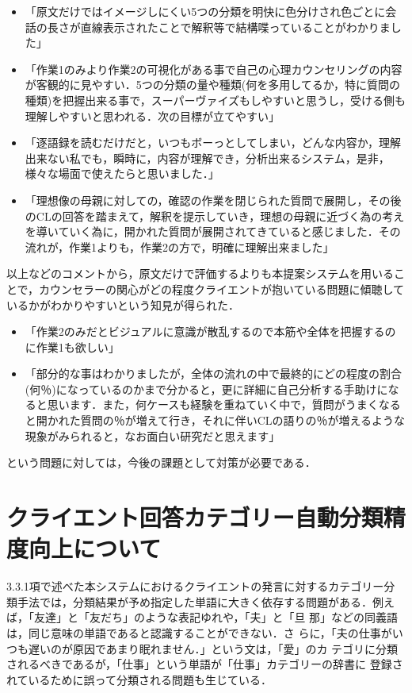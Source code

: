 \documentclass[shuuron]{kuee}
\begin{document}
%
\begin{itemize}
\item 「原文だけではイメージしにくい5つの分類を明快に色分けされ色ごとに会話の長さが直線表示されたことで解釈等で結構喋っていることがわかりました」
\item 「作業1のみより作業2の可視化がある事で自己の心理カウンセリングの内容が客観的に見やすい．5つの分類の量や種類(何を多用してるか，特に質問の種類)を把握出来る事で，スーパーヴァイズもしやすいと思うし，受ける側も理解しやすいと思われる．次の目標が立てやすい」
\item 「逐語録を読むだけだと，いつもボーっとしてしまい，どんな内容か，理解出来ない私でも，瞬時に，内容が理解でき，分析出来るシステム，是非，様々な場面で使えたらと思いました．」
\item 「理想像の母親に対しての，確認の作業を閉じられた質問で展開し，その後のCLの回答を踏まえて，解釈を提示していき，理想の母親に近づく為の考えを導いていく為に，開かれた質問が展開されてきていると感じました．その流れが，作業1よりも，作業2の方で，明確に理解出来ました」
\end{itemize}
以上などのコメントから，原文だけで評価するよりも本提案システムを用いることで，カウンセラーの関心がどの程度クライエントが抱いている問題に傾聴しているかがわかりやすいという知見が得られた．

\begin{itemize}
\item 「作業2のみだとビジュアルに意識が散乱するので本筋や全体を把握するのに作業1も欲しい」
\item 「部分的な事はわかりましたが，全体の流れの中で最終的にどの程度の割合(何％)になっているのかまで分かると，更に詳細に自己分析する手助けになると思います．また，何ケースも経験を重ねていく中で，質問がうまくなると開かれた質問の％が増えて行き，それに伴いCLの語りの％が増えるような現象がみられると，なお面白い研究だと思えます」
\end{itemize}
という問題に対しては，今後の課題として対策が必要である．


\section{クライエント回答カテゴリー自動分類精度向上について}%


3.3.1項で述べた本システムにおけるクライエントの発言に対するカテゴリー分類手法では，分類結果が予め指定した単語に大きく依存する問題がある．例えば，「友達」と「友だち」のような表記ゆれや，「夫」と「旦
那」などの同義語は，同じ意味の単語であると認識することができない．さ
らに，「夫の仕事がいつも遅いのが原因であまり眠れません．」という文は，「愛」のカ
テゴリに分類されるべきであるが，「仕事」という単語が「仕事」カテゴリーの辞書に
登録されているために誤って分類される問題も生じている．
\end{document}
